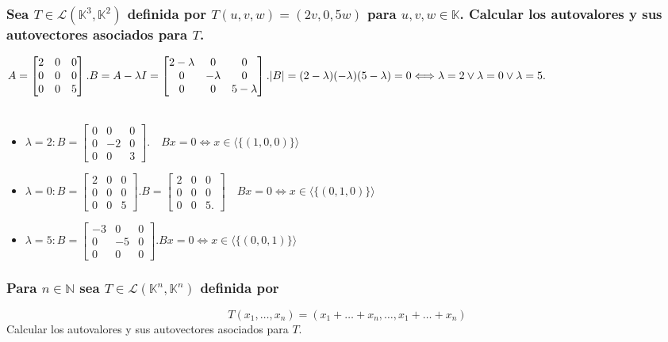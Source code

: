 \documentclass{article}
\begin{document}
\subsubsection{Sea $T \in \mathcal{L}(\mathbb{K}^3,\mathbb{K}^2)$ definida por $T(u,v,w) = (2v,0,5w)$ para $u,v,w \in \mathbb{K}$.
Calcular los autovalores y sus autovectores asociados para $T$.}
$A = \begin{bmatrix} 2&0&0\\ 0&0&0 \\ 0&0&5\end{bmatrix}. B = A - \lambda I =  \begin{bmatrix}2-\lambda&0&0\\0&-\lambda&0\\0&0&5-\lambda
\end{bmatrix}. \\ \\
|B| = (2-\lambda)(-\lambda)(5-\lambda)=0 \Longleftrightarrow \lambda = 2 \vee \lambda = 0 \vee \lambda = 5.$ \\ \\
\begin{itemize}
\item
	$\lambda = 2: B = \begin{bmatrix} 0&0&0\\0&-2&0\\0&0&3 \end{bmatrix}. 
	\quad Bx = 0 \Longleftrightarrow x \in \langle \{ (1,0,0 )\} \rangle$
\item
	$\lambda = 0: B =  \begin{bmatrix} 2&0&0\\0&0&0\\0&0&5 \end{bmatrix}. B = \begin{bmatrix}2&0&0\\0&0&0\\0&0&5.\end{bmatrix}
	\quad Bx = 0 \Longleftrightarrow x \in \langle \{ (0,1,0 )\} \rangle$
\item
	$\lambda = 5: B = \begin{bmatrix} -3&0&0\\0&-5&0\\0&0&0 \end{bmatrix}. Bx = 0 \Longleftrightarrow x \in \langle \{ (0,0,1) \} \rangle$
\end{itemize}

\subsubsection{Para $n \in \mathbb{N}$ sea $T \in \mathcal{L}(\mathbb{K}^n,\mathbb{K}^n)$ definida por}
\[
T(x_1,\dots,x_n) = (x_1+\dots+x_n,\dots,x_1+\dots+x_n)
\]
Calcular los autovalores y sus autovectores asociados para $T$.
\end{document}
